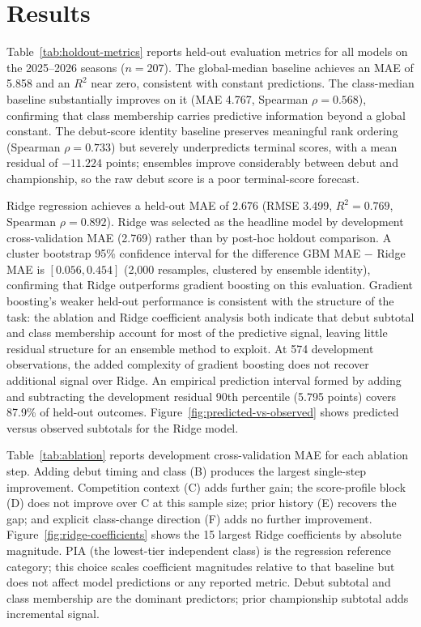 \section{Results}
\label{sec:results}



Table~\ref{tab:holdout-metrics} reports held-out evaluation metrics for all
models on the 2025--2026 seasons ($n = 207$). The global-median baseline
achieves an MAE of 5.858 and an $R^2$ near zero, consistent with constant
predictions. The class-median baseline substantially improves on it (MAE
4.767, Spearman $\rho = 0.568$), confirming that class membership carries
predictive information beyond a global constant. The debut-score identity
baseline preserves meaningful rank ordering (Spearman $\rho = 0.733$) but
severely underpredicts terminal scores, with a mean residual of $-11.224$
points; ensembles improve considerably between debut and championship, so the
raw debut score is a poor terminal-score forecast.

Ridge regression achieves a held-out MAE of 2.676 (RMSE 3.499, $R^2 = 0.769$,
Spearman $\rho = 0.892$). Ridge was selected as the headline model by
development cross-validation MAE (2.769) rather than by post-hoc holdout
comparison. A cluster bootstrap 95\% confidence interval for the
difference GBM MAE $-$ Ridge MAE is $[0.056, 0.454]$ (2,000 resamples, clustered by ensemble identity), confirming that Ridge
outperforms gradient boosting on this evaluation. Gradient boosting's weaker
held-out performance is consistent with the structure of the task: the ablation
and Ridge coefficient analysis both indicate that debut subtotal and class
membership account for most of the predictive signal, leaving little residual
structure for an ensemble method to exploit. At 574 development observations,
the added complexity of gradient boosting does not recover additional signal
over Ridge. An empirical prediction
interval formed by adding and subtracting the development residual 90th
percentile (5.795 points) covers 87.9\% of held-out outcomes.
Figure~\ref{fig:predicted-vs-observed} shows predicted versus observed
subtotals for the Ridge model.





Table~\ref{tab:ablation} reports development cross-validation MAE for each
ablation step. Adding debut timing and class (B) produces the largest
single-step improvement. Competition context (C) adds further gain; the
score-profile block (D) does not improve over C at this sample size; prior
history (E) recovers the gap; and explicit class-change direction (F)
adds no further improvement. Figure~\ref{fig:ridge-coefficients} shows the 15
largest Ridge coefficients by absolute magnitude. PIA (the lowest-tier
independent class) is the regression reference category; this choice scales
coefficient magnitudes relative to that baseline but does not affect model
predictions or any reported metric. Debut subtotal and class membership are
the dominant predictors; prior championship subtotal adds incremental signal.

